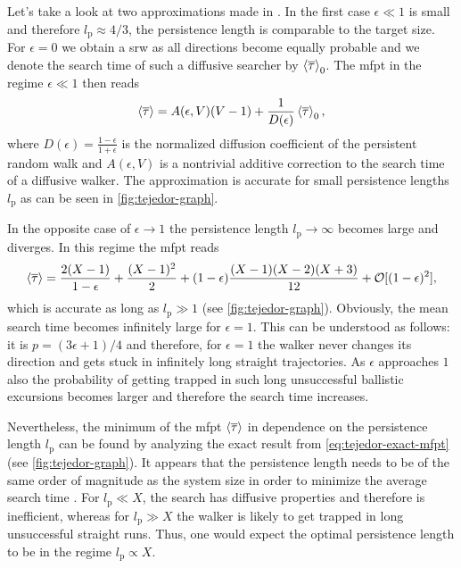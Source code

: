 Let's take a look at two approximations made in \cite{tejedor:2012}. In the first case $\epsilon \ll 1$ is small and therefore $l_\textrm{p} \approx 4/3$, \ie the persistence length is comparable to the target size. For $\epsilon = 0$ we obtain a \ac{srw} as all directions become equally probable and we denote the search time of such a diffusive searcher by $\mfpt[\mean{\tau}]_0$. The \ac{mfpt} in the regime $\epsilon \ll 1$ then reads \cite{tejedor:2012}
\begin{equation*}
 \mfpt[\mean{\tau}] = A(\epsilon, V) (V - 1) + \frac{1}{D(\epsilon)} \mfpt[\mean{\tau}]_0,
\end{equation*}
where $D(\epsilon) = \frac{1-\epsilon}{1+\epsilon}$ is the normalized diffusion coefficient of the persistent random walk and $A(\epsilon, V)$ is a nontrivial additive correction to the search time of a diffusive walker. The approximation is accurate for small persistence lengths $l_\textrm{p}$ as can be seen in \autoref{fig:tejedor-graph}.

In the opposite case of $\epsilon \rightarrow 1$ the persistence length $l_\textrm{p} \rightarrow \infty$ becomes large and diverges. In this regime the \ac{mfpt} reads \cite{tejedor:2012}
\begin{equation*}
 \mfpt[\mean{\tau}] = \frac{2(X-1)}{1-\epsilon} + \frac{(X-1)^2}{2} + (1-\epsilon)\frac{(X-1)(X-2)(X+3)}{12} + \mathcal{O}[(1-\epsilon)^2],
\end{equation*}
which is accurate as long as $l_\textrm{p} \gg 1$ (see \autoref{fig:tejedor-graph}). Obviously, the mean search time becomes infinitely large for $\epsilon = 1$. This can be understood as follows: it is $p = (3\epsilon + 1) / 4$ and therefore, for $\epsilon = 1$ the walker never changes its direction and gets stuck in infinitely long straight trajectories. As $\epsilon$ approaches $1$ also the probability of getting trapped in such long unsuccessful ballistic excursions becomes larger and therefore the search time increases.

Nevertheless, the minimum of the \ac{mfpt} $\mfpt[\mean{\tau}]$ in dependence on the persistence length $l_\textrm{p}$ can be found by analyzing the exact result from \autoref{eq:tejedor-exact-mfpt} (see \autoref{fig:tejedor-graph}). It appears that the persistence length needs to be of the same order of magnitude as the system size in order to minimize the average search time \cite{tejedor:2012}. For $l_\textrm{p} \ll X$, the search has diffusive properties and therefore is inefficient, whereas for $l_\textrm{p} \gg X$ the walker is likely to get trapped in long unsuccessful straight runs. Thus, one would expect the optimal persistence length to be in the regime $l_\textrm{p} \propto X$.

